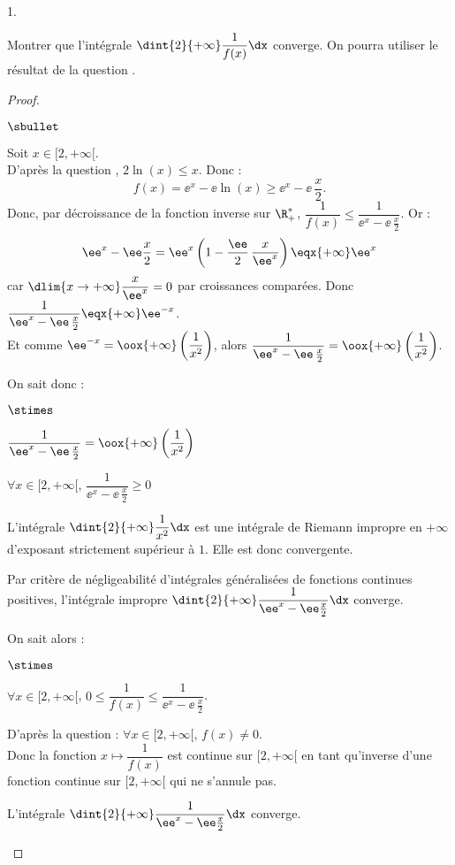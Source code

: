 \documentclass[11pt]{article}%
\begin{document}
\begin{noliste}{1.}
\newpage

\item Montrer que l'intégrale $\dint{2}{+\infty} \dfrac{1}{f(x)}\dx$
  converge.  On pourra utiliser le résultat de la question
  .

\begin{proof}~
\begin{noliste}{$\sbullet$}
\item Soit $x\in[2,+\infty[$.\\
D'après la question , $2\ln(x)\leq x$. Donc :
\[
f(x)=\ee^x - \ee \ln(x)\geq \ee^x - \ee \, \frac{x}{2}.
\]
Donc, par décroissance de la fonction inverse sur $\R_+^*$, 
$\dfrac{1}{f(x)}\leq \dfrac{1}{\ee^x-\ee \, \frac{x}{2}}$.
Or :
\[
\ee^x - \ee\frac{x}{2} = \ee^x \left(1 - 
\frac{\ee}{2} \, \frac{x}{\ee^x}\right) \eqx{+\infty} \ee^x
\]
car $\dlim{x\to +\infty} \dfrac{x}{\ee^x}=0$ par croissances comparées. 
Donc
$\dfrac{1}{\ee^x-\ee \, \frac{x}{2}} \eqx{+\infty} \ee^{-x}$.\\[.2cm]
Et comme 
$\ee^{-x}= \oox{+\infty}\left(\dfrac{1}{x^2}\right)$, alors
$\dfrac{1}{\ee^x-\ee \, \frac{x}{2}} = \oox{+\infty} 
\left(\dfrac{1}{x^2}\right)$.

\item On sait donc :
\begin{noliste}{$\stimes$}
  \item $\dfrac{1}{\ee^x-\ee \, \frac{x}{2}} = \oox{+\infty} 
  \left(\dfrac{1}{x^2}\right)$
  
  \item $\forall x\in [2,+\infty[$, $\dfrac{1}{\ee^x-\ee \, \frac{x}{2}}
  \geq 0$
  
  \item L'intégrale $\dint{2}{+\infty} \dfrac{1}{x^2}\dx$ est une 
  intégrale de Riemann impropre en $+\infty$ d'exposant strictement 
  supérieur à $1$. Elle est donc convergente.
\end{noliste}
Par critère de négligeabilité d'intégrales généralisées de fonctions
continues positives, l'intégrale impropre $\dint{2}{+\infty}
\dfrac{1}{\ee^x-\ee \frac{x}{2}} \dx$ converge.

\item On sait alors :
\begin{noliste}{$\stimes$}
  \item $\forall x\in [2,+\infty[$, $0\leq \dfrac{1}{f(x)}\leq 
  \dfrac{1}{\ee^x-\ee \, \frac{x}{2}}$.
  \item D'après la question  : $\forall x\in 
  [2,+\infty[$, $f(x)\neq 0$.\\[.2cm]
  Donc la fonction $x\mapsto \dfrac{1}{f(x)}$ est continue sur 
  $[2,+\infty[$ en tant qu'inverse d'une fonction continue
  sur $[2,+\infty[$ qui ne 
  s'annule pas.
  \item L'intégrale $\dint{2}{+\infty} 
  \dfrac{1}{\ee^x-\ee \frac{x}{2}} \dx$ converge.
  \end{noliste}


\end{noliste}
\end{proof}
\end{noliste}
\end{document}
